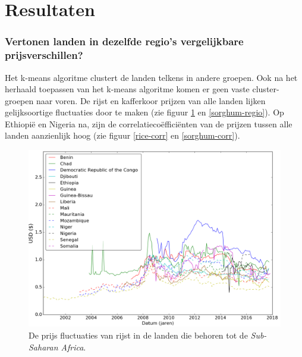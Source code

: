 \documentclass{article}
\begin{document}
\newpage
\section*{Resultaten}

\subsubsection*{Vertonen landen in dezelfde regio’s vergelijkbare prijsverschillen?}
Het k-means algoritme clustert de landen telkens in andere groepen.
Ook na het herhaald toepassen van het k-means algoritme komen er geen vaste cluster-groepen naar voren. 
De rijst en kafferkoor prijzen van alle landen lijken gelijksoortige fluctuaties door te maken (zie figuur \ref{rice-regio} en \ref{sorghum-regio}).
Op Ethiopië en Nigeria na, zijn de correlatiecoëfficiënten van de prijzen tussen alle landen aanzienlijk hoog (zie figuur \ref{rice-corr} en \ref{sorghum-corr}).


 \begin{figure}[h!]
        \centering
        \includegraphics[scale=0.30]{rice.png}
        \caption{De prijs fluctuaties van rijst in de landen die behoren tot de \textit{Sub-Saharan Africa}.}
        \label{rice-regio}
        \medskip
        \small
        \end{figure}
\end{document}
